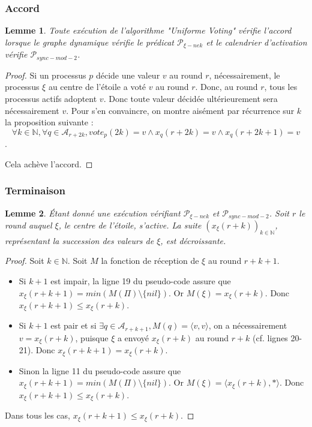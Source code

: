 \documentclass{article}
\newtheorem{lemma}{Lemme}
\begin{document}
\subsubsection{Accord}

\begin{lemma}
	Toute exécution de l'algorithme "Uniforme Voting" vérifie l'accord lorsque le graphe dynamique vérifie le prédicat $\mathcal{P}_{\xi-nek}$
	et le calendrier d'activation vérifie $\mathcal{P}_{sync-mod-2}$.
\end{lemma}
\begin{proof}
	Si un processus $p$ décide une valeur $v$ au round $r$, nécessairement, le processus $\xi$ au centre de l'étoile a voté $v$ au round $r$.
	Donc, au round $r$, tous les processus actifs adoptent $v$.
	Donc toute valeur décidée ultérieurement sera nécessairement $v$. Pour s'en convaincre, on montre aisément par récurrence sur $k$ la proposition suivante :
	$$\forall k \in \mathds{N}, \forall q \in \mathcal{A}_{r+2k}, vote_p(2k) = v \wedge x_q(r+2k) = v \wedge x_q(r+2k+1) = v$$.

	Cela achève l'accord.
\end{proof}

\subsubsection{Terminaison}

	\begin{lemma}
		Étant donné une exécution vérifiant $\mathcal{P}_{\xi-nek}$ et $\mathcal{P}_{sync-mod-2}$.
		Soit $r$ le round auquel $\xi$, le centre de l'étoile, s'active.
		La suite $(x_\xi(r+k))_{k \in \mathds{N}}$, représentant la succession des valeurs de $\xi$, est décroissante.
	\end{lemma}
	\begin{proof}
		Soit $k \in \mathds{N}$. Soit $M$ la fonction de réception de $\xi$ au round $r+k+1$.
		\begin{itemize}

			\item Si $k+1$ est impair, la ligne 19 du pseudo-code assure que $x_\xi(r+k+1) = min(M(\Pi) \setminus \{nil\})$.
				Or $M(\xi) = x_\xi(r+k)$.  Donc $x_\xi(r+k+1) \leq x_\xi(r+k)$.
			\item Si $k+1$ est pair et si $\exists q \in \mathcal{A}_{r+k+1}, M(q) = \langle v, v \rangle$,
				on a nécessairement $v = x_\xi(r+k)$, puisque $\xi$ a envoyé $x_\xi(r+k)$ au round $r+k$ (cf. lignes 20-21).
				Donc $x_\xi(r+k+1) = x_\xi(r+k)$.
			\item Sinon la ligne 11 du pseudo-code assure que $x_\xi(r+k+1) = min(M(\Pi) \setminus \{nil\})$.
				Or $M(\xi) = \langle x_\xi(r+k), * \rangle$.
				Donc $x_\xi(r+k+1) \leq x_\xi(r+k)$.

		\end{itemize}
		Dans tous les cas, $x_\xi(r+k+1) \leq x_\xi(r+k)$.
	\end{proof}
		
\end{document}
